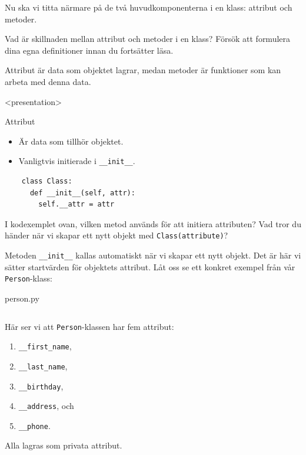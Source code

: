 Nu ska vi titta närmare på de två huvudkomponenterna i en klass: attribut
och metoder.

\begin{exercise}
  Vad är skillnaden mellan attribut och metoder i en klass?
  Försök att formulera dina egna definitioner innan du fortsätter läsa.
\end{exercise}

Attribut är data som objektet lagrar, medan metoder är funktioner som kan 
arbeta med denna data.

\begin{frame}[fragile]
  \begin{onlyenv}<presentation>
  \begin{block}{Attribut}
    \begin{itemize}
      \item Är data som tillhör objektet.
      \item Vanligtvis initierade i \texttt{__init__}.
    \end{itemize}
  \end{block}
  \end{onlyenv}

  \begin{verbatim}
    class Class:
      def __init__(self, attr):
        self.__attr = attr
  \end{verbatim}
\end{frame}

\begin{exercise}
  I kodexemplet ovan, vilken metod används för att initiera attributen? 
  Vad tror du händer när vi skapar ett nytt objekt med 
  \texttt{Class(attribute)}?
\end{exercise}

Metoden \texttt{__init__} kallas automatiskt när vi skapar 
ett nytt objekt. Det är här vi sätter startvärden för objektets attribut. 
Låt oss se ett konkret exempel från vår \texttt{Person}-klass:

\begin{frame}[fragile]
  person.py \hrulefill
  \inputminted[linenos,lastline=15]{python}{examples/person.py}
\end{frame}

Här ser vi att \texttt{Person}-klassen har fem attribut: 
\begin{enumerate}
  \item \texttt{__first_name},
  \item \texttt{__last_name}, 
  \item \texttt{__birthday},
  \item \texttt{__address}, och 
  \item \texttt{__phone}.
\end{enumerate}
Alla lagras som privata attribut.

